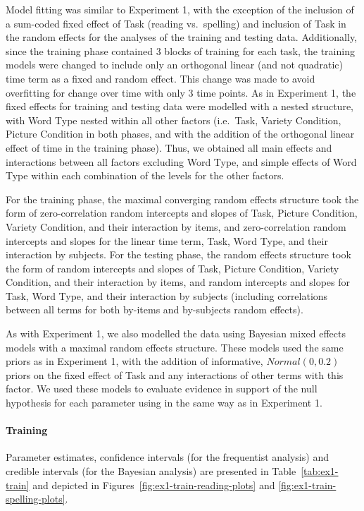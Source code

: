 \documentclass[doc,floatsintext]{apa6}
\let\oldparagraph\paragraph
\renewcommand{\paragraph}[1]{\oldparagraph{#1}\mbox{}}
\begin{document}
Model fitting was similar to Experiment 1, with the exception of the
inclusion of a sum-coded fixed effect of Task (reading vs.~spelling) and
inclusion of Task in the random effects for the analyses of the training
and testing data. Additionally, since the training phase contained 3
blocks of training for each task, the training models were changed to
include only an orthogonal linear (and not quadratic) time term as a
fixed and random effect. This change was made to avoid overfitting for
change over time with only 3 time points. As in Experiment 1, the fixed
effects for training and testing data were modelled with a nested
structure, with Word Type nested within all other factors (i.e.~Task,
Variety Condition, Picture Condition in both phases, and with the
addition of the orthogonal linear effect of time in the training phase).
Thus, we obtained all main effects and interactions between all factors
excluding Word Type, and simple effects of Word Type within each
combination of the levels for the other factors.

For the training phase, the maximal converging random effects structure
took the form of zero-correlation random intercepts and slopes of Task,
Picture Condition, Variety Condition, and their interaction by items,
and zero-correlation random intercepts and slopes for the linear time
term, Task, Word Type, and their interaction by subjects. For the
testing phase, the random effects structure took the form of random
intercepts and slopes of Task, Picture Condition, Variety Condition, and
their interaction by items, and random intercepts and slopes for Task,
Word Type, and their interaction by subjects (including correlations
between all terms for both by-items and by-subjects random effects).

As with Experiment 1, we also modelled the data using Bayesian mixed
effects models with a maximal random effects structure. These models
used the same priors as in Experiment 1, with the addition of
informative, \(Normal(0, 0.2)\) priors on the fixed effect of Task and
any interactions of other terms with this factor. We used these models
to evaluate evidence in support of the null hypothesis for each
parameter using in the same way as in Experiment 1.

\paragraph{Training}\label{training-1}

Parameter estimates, confidence intervals (for the frequentist analysis)
and credible intervals (for the Bayesian analysis) are presented in
Table~\ref{tab:ex1-train} and depicted in
Figures~\ref{fig:ex1-train-reading-plots} and
\ref{fig:ex1-train-spelling-plots}.
\end{document}
